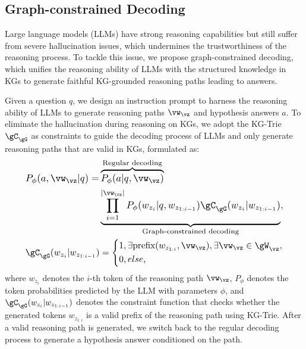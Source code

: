 \subsection{Graph-constrained Decoding}

Large language models (LLMs) have strong reasoning capabilities but still suffer from severe hallucination issues, which undermines the trustworthiness of the reasoning process. To tackle this issue, we propose graph-constrained decoding, which unifies the reasoning ability of LLMs with the structured knowledge in KGs to generate faithful KG-grounded reasoning paths leading to answers.

Given a question $q$, we design an instruction prompt to harness the reasoning ability of LLMs to generate reasoning paths $\vw_\vz$ and hypothesis answers $a$. To eliminate the hallucination during reasoning on KGs, we adopt the KG-Trie $\gC_{\gG}$ as constraints to guide the decoding process of LLMs and only generate reasoning paths that are valid in KGs, formulated as:
{
\setlength\abovedisplayskip{0pt}  
\setlength\belowdisplayskip{2pt}  
\begin{gather}
    \resizebox{.9\columnwidth}{!}{$
    \begin{aligned}
    P_\phi(a, \vw_\vz|q) = &\overbrace{P_\phi(a|q,\vw_\vz)}^{\text{Regular decoding}} \\
    & \underbrace{\prod_{i=1}^{|\vw_\vz|} P_\phi(w_{z_i}|q, w_{z_{1:i-1}}) \gC_{\gG}(w_{z_i}|w_{z_{1:i-1}})}_{\text{Graph-constrained decoding}}, 
    \end{aligned}
    $}
    \\
    \resizebox{.9\columnwidth}{!}{$
    \gC_{\gG}(w_{z_i}|w_{z_{1:i-1}}) = \left\{
        \begin{aligned}
             & 1, \exists \text{prefix}(w_{z_{1:i}},\vw_\vz), \exists \vw_\vz\in\gW_{\vz}, \\
             & 0, else,
        \end{aligned}
        \right.
        $}
\end{gather}
where $w_{z_i}$ denotes the $i$-th token of the reasoning path $\vw_\vz$, $P_\phi$ denotes the token probabilities predicted by the LLM with parameters $\phi$, and $\gC_{\gG}(w_{z_i}|w_{z_{1:i-1}})$ denotes the constraint function that checks whether the generated tokens $w_{z_{1: i}}$ is a valid prefix of the reasoning path using KG-Trie. After a valid reasoning path is generated, we switch back to the regular decoding process to generate a hypothesis answer conditioned on the path.
}

